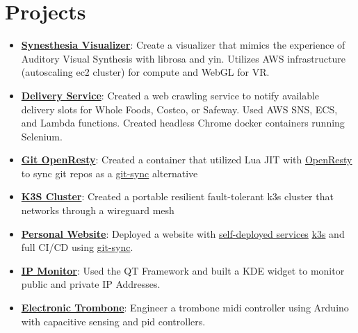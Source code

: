 \documentclass[letterpaper,11pt]{article}
\newcommand{\resumeItem}[2]{
	\item[]\small{
		\textbf{#1}{: #2 \vspace{-2pt}}
	}
}
\newcommand{\resumeSubHeadingListStart}{\begin{itemize}[leftmargin=1mm]}
\newcommand{\resumeSubHeadingListEnd}{\end{itemize}}
\begin{document}
\section{Projects}
\resumeSubHeadingListStart

\resumeItem{\href{https://github.com/sachiniyer/SynesthesiaVisualizer}{Synesthesia Visualizer}}
{Create a visualizer that mimics the experience of Auditory Visual Synthesis with librosa and yin. Utilizes AWS infrastructure (autoscaling ec2 cluster) for compute and WebGL for VR.}

\resumeItem{\href{https://github.com/sachiniyer/delivery-service}{Delivery Service}}
{Created a web crawling service to notify available delivery slots for Whole Foods, Costco, or Safeway. Used AWS SNS, ECS, and Lambda functions. Created headless Chrome docker containers running Selenium.}

\resumeItem{\href{https://github.com/sachiniyer/git-openresty}{Git OpenResty}}
{Created a container that utilized Lua JIT with \href{https://openresty.org/en/}{OpenResty} to sync git repos as a \href{https://github.com/kubernetes/git-sync}{git-sync} alternative}

\resumeItem{\href{https://github.com/sachiniyer/cheap_portable_k3s}{K3S Cluster}}
{Created a portable resilient fault-tolerant k3s cluster that networks through a wireguard mesh}

\resumeItem{\href{https://sachiniyer.com}{Personal Website}}
{Deployed a website with \href{https://github.com/sachiniyer/cheap_portable_k3s\#applications}{self-deployed services} \href{https://github.com/sachiniyer/cheap_portable_k3s/blob/main/README.pdf}{k3s} and full CI/CD using \href{https://github.com/kubernetes/git-sync}{git-sync}.}

\resumeItem{\href{https://github.com/sachiniyer/ip-monitor}{IP Monitor}}
{Used the QT Framework and built a KDE widget to monitor public and private IP Addresses.}

\resumeItem{\href{https://github.com/sachiniyer/Electric-Trombone}{Electronic Trombone}}
{Engineer a trombone midi controller using Arduino with capacitive sensing and pid controllers.}

\resumeSubHeadingListEnd

%
\end{document}
